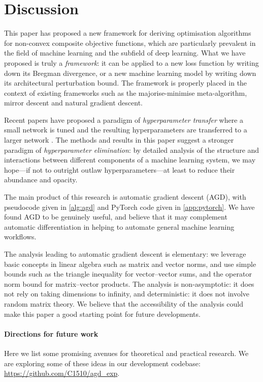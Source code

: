 \section{Discussion}

This paper has proposed a new framework for deriving optimisation algorithms for non-convex composite objective functions, which are particularly prevalent in the field of machine learning and the subfield of deep learning. What we have proposed is truly a \textit{framework}: it can be applied to a new loss function by writing down its Bregman divergence, or a new machine learning model by writing down its architectural perturbation bound. The framework is properly placed in the context of existing frameworks such as the majorise-minimise meta-algorithm, mirror descent and natural gradient descent.

Recent papers have proposed a paradigm of \textit{hyperparameter transfer} where a small network is tuned and the resulting hyperparameters are transferred to a larger network \citep{yang2021tuning, bernstein-thesis}. The methods and results in this paper suggest a stronger paradigm of \textit{hyperparameter elimination}: by detailed analysis of the structure and interactions between different components of a machine learning system, we may hope---if not to outright outlaw hyperparameters---at least to reduce their abundance and opacity.

The main product of this research is automatic gradient descent (AGD), with pseudocode given in \cref{alg:agd} and PyTorch code given in \cref{app:pytorch}. We have found AGD to be genuinely useful, and believe that it may complement automatic differentiation in helping to automate general machine learning workflows.

The analysis leading to automatic gradient descent is elementary: we leverage basic concepts in linear algebra such as matrix and vector norms, and use simple bounds such as the triangle inequality for vector--vector sums, and the operator norm bound for matrix--vector products. The analysis is non-asymptotic: it does not rely on taking dimensions to infinity, and deterministic: it does not involve random matrix theory. We believe that the accessibility of the analysis could make this paper a good starting point for future developments.

\paragraph{Directions for future work} Here we list some promising avenues for theoretical and practical research. We are exploring some of these ideas in our development codebase: \url{https://github.com/C1510/agd_exp}.

